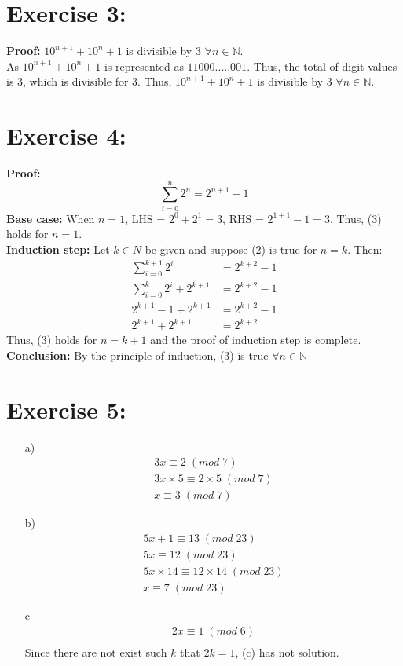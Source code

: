 \documentclass{article}
\newcommand{\N}{\mathbb{N}}
\begin{document}
	\section{Exercise 3:}
		\Large\textbf{Proof:} $10^{n+1}  + 10^n + 1$ is divisible by 3 $\forall n \in \N$.\\
		As $10^{n+1}  + 10^n + 1$ is represented as $11000.....001$. Thus, the total of digit values is 3, which is divisible for 3. Thus, $10^{n+1}  + 10^n + 1$ is divisible by 3 $\forall n \in \N$.
		
	\section{Exercise 4:}
		\Large\textbf{Proof:}
		\begin{equation}
			\sum_{i=0}^{n} 2^n = 2^{n+1} -1
		\end{equation}
		\Large\textbf{Base case:} When $n=1$, LHS = $2^0 + 2^1 = 3$, RHS = $2^{1+1} -1 = 3$. Thus, (3) holds for $n=1$.\\
		\Large\textbf{Induction step:}
		Let $k \in N$ be given and suppose (2) is true for $n = k.$ Then:\\
		\begin{align*}
			\sum_{i=0}^{k+1} 2^i &= 2^{k+2} - 1\\
			\sum_{i=0}^{k} 2^i + 2^{k+1} &= 2^{k+2} - 1\\
			2^{k+1} - 1 + 2^{k+1} &= 2^{k+2} -1\\
			2^{k+1} + 2^{k+1} &= 2^{k+2}
		\end{align*}
		Thus, (3) holds for $n=k+1$ and the proof of induction step is complete.
		\Large\textbf{Conclusion:} By the principle of induction, (3) is true $\forall n \in \N$
	
	\section{Exercise 5:}
		\begin{enumerate}
			\item[a)]
				\begin{align*}
					3x \equiv 2 \;(mod \; 7)\\
					3x\times5 \equiv 2\times5 \; (mod \; 7)\\
					x \equiv 3 \; (mod \; 7)
				\end{align*}
			\item[b)]
				\begin{align*}
					5x + 1 \equiv 13 \; (mod \; 23)\\
					5x \equiv 12 \; (mod \; 23)\\
					5x\times14 \equiv 12\times14 \; (mod \; 23)\\
					x \equiv 7 \; (mod \; 23)
				\end{align*}
			\item[c]
				\begin{align*}
					2x \equiv 1 \; (mod \; 6)\\
				\end{align*}
				Since there are not exist such $k$ that $2k=1$, (c) has not solution.
		\end{enumerate}
	
\end{document}
